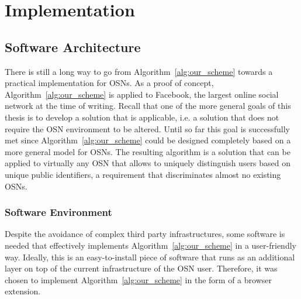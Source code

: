 \chapter{Implementation}
\label{cha:n}




\section{Software Architecture}
There is still a long way to go from Algorithm~\ref{alg:our_scheme} towards a practical implementation for OSNs. As a proof of concept, Algorithm~\ref{alg:our_scheme} is applied to Facebook, the largest online social network at the time of writing. Recall that one of the more general goals of this thesis is to develop a solution that is applicable, i.e. a solution that does not require the OSN environment to be altered. Until so far this goal is successfully met since Algorithm~\ref{alg:our_scheme} could be designed completely based on a more general model for OSNs. The resulting algorithm is a solution that can be applied to virtually any OSN that allows to uniquely distinguish users based on unique public identifiers, a requirement that discriminates almost no existing OSNs.

\subsection{Software Environment}
Despite the avoidance of complex third party infrastructures, some software is needed that effectively implements Algorithm~\ref{alg:our_scheme} in a user-friendly way. Ideally, this is an easy-to-install piece of software that runs as an additional layer on top of the current infrastructure of the OSN user. Therefore, it was chosen to implement Algorithm~\ref{alg:our_scheme} in the form of a browser extension.

